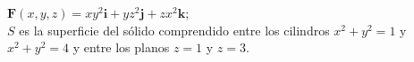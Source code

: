 \item $\mathbf{F}(x, y, z) = xy^2\mathbf{i} + yz^2\mathbf{j} + zx^2\mathbf{k}$;\\
    $S$ es la superficie del sólido comprendido entre los cilindros $x^2 + y^2 = 1$ y $x^2 + y^2 = 4$ y entre los planos $z = 1$ y $z = 3$.
